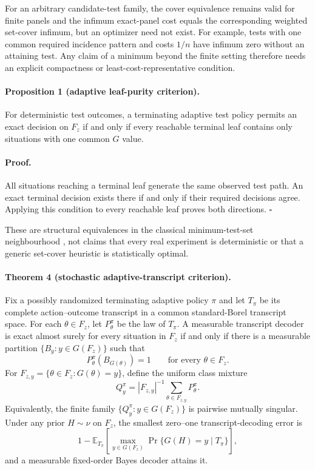 For an arbitrary candidate-test family, the cover equivalence remains valid
for finite panels and the infimum exact-panel cost equals the corresponding
weighted set-cover infimum, but an optimizer need not exist.  For example,
tests with one common required incidence pattern and costs $1/n$ have infimum
zero without an attaining test.  Any claim of a minimum beyond the finite
setting therefore needs an explicit compactness or least-cost-representative
condition.

\paragraph{Proposition 1 (adaptive leaf-purity criterion).}
For deterministic test outcomes, a terminating adaptive test policy permits an
exact decision on $F_z$ if and only if every reachable terminal leaf contains
only situations with one common $G$ value.

\paragraph{Proof.}
All situations reaching a terminal leaf generate the same observed test path.
An exact terminal decision exists there if and only if their required decisions
agree. Applying this condition to every reachable leaf proves both directions.
\hfill$\square$

These are structural equivalences in the classical minimum-test-set
neighbourhood \cite{moret1985}, not claims that every real experiment is
deterministic or that a generic set-cover heuristic is statistically optimal.

\paragraph{Theorem 4 (stochastic adaptive-transcript criterion).}
Fix a possibly randomized terminating adaptive policy $\pi$ and let $T_\pi$
be its complete action--outcome transcript in a common standard-Borel transcript
space.  For each $\theta\in F_z$, let $P_\theta^\pi$ be the law of $T_\pi$.
A measurable transcript decoder is exact almost surely for every situation in
$F_z$ if and only if there is a measurable partition
$\{B_y:y\in G(F_z)\}$ such that
\[
  P_\theta^\pi(B_{G(\theta)})=1
  \qquad\text{for every }\theta\in F_z.
\]
For $F_{z,y}=\{\theta\in F_z:G(\theta)=y\}$, define the uniform class mixture
\[
  Q_y^\pi=|F_{z,y}|^{-1}\sum_{\theta\in F_{z,y}}P_\theta^\pi.
\]
Equivalently, the finite family $\{Q_y^\pi:y\in G(F_z)\}$ is pairwise mutually
singular. Under any prior $H\sim\nu$ on $F_z$, the smallest zero--one
transcript-decoding error is
\[
  1-\mathbb E_{T_\pi}\!\left[
    \max_{y\in G(F_z)}\Pr\{G(H)=y\mid T_\pi\}
  \right],
\]
and a measurable fixed-order Bayes decoder attains it.

